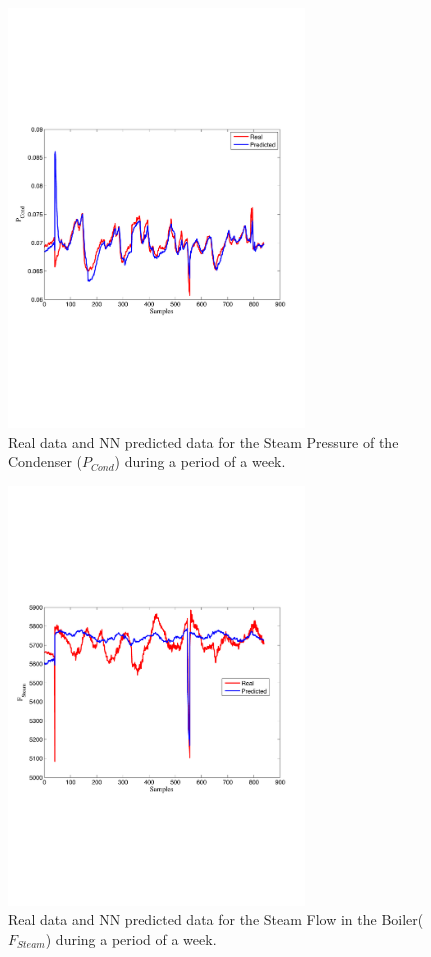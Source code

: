 \begin{figure}
\centering
\includegraphics[width=0.7\textwidth]{nne0bis.pdf}
\caption{Real data and NN predicted data for the Steam Pressure of the Condenser  ($P_{Cond}$) during a period of a week.}
\label{Pcond}
\end{figure}

\begin{figure}
\centering
\includegraphics[width=0.7\textwidth]{nne1bis.pdf}
\caption{Real data and NN predicted data for the Steam Flow in the Boiler($F_{Steam}$) during a period of a week.}
\label{Fboiler}
\end{figure}

